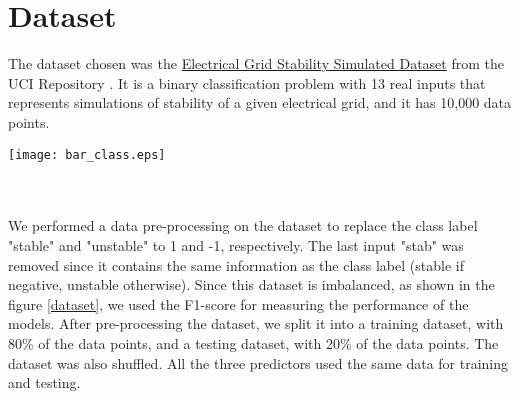 \documentclass{article}
\newcommand{\enterProblemHeader}[1]{
\nobreak\extramarks{#1}{#1}\nobreak
\nobreak\extramarks{#1}{#1}\nobreak
}
\newcommand{\exitProblemHeader}[1]{
\nobreak\extramarks{#1}{#1}\nobreak
\nobreak\extramarks{#1}{}\nobreak
}
\newcounter{homeworkProblemCounter} %
\newcommand{\homeworkProblemName}{}
\newenvironment{homeworkProblem}[1][Problem \arabic{homeworkProblemCounter}]{ %
\stepcounter{homeworkProblemCounter} %
\renewcommand{\homeworkProblemName}{#1} %
\section{\homeworkProblemName} %
\enterProblemHeader{} %
}{
\exitProblemHeader{} %
}
\begin{document}
\begin{homeworkProblem}[Dataset]
The dataset chosen was the \href{http://archive.ics.uci.edu/ml/datasets/Electrical+Grid+Stability+Simulated+Data+}{Electrical Grid Stability Simulated Dataset} from the UCI Repository \cite{UCI}. It is a binary classification problem with 13 real inputs that represents simulations of stability of a given electrical grid, and it has 10,000 data points.
\begin{multicols*}{2}
\begin{minipage}[t]{0.44\textwidth}
\centering
    \texttt{[image: bar\_class.eps]}
 \label{dataset}
\end{minipage}
\\
\\
We performed a data pre-processing on the dataset to replace the class label "stable" and "unstable" to 1 and -1, respectively. The last input "stab" was removed since it contains the same information as the class label (stable if negative, unstable otherwise). Since this dataset is imbalanced, as shown in the figure \ref{dataset}, we used the F1-score for measuring the performance of the models. After pre-processing the dataset, we split it into a training dataset, with 80\% of the data points, and a testing dataset, with 20\% of the data points. The dataset was also shuffled. All the three predictors used the same data for training and testing. 
\end{multicols*}
\end{homeworkProblem}
\clearpage
\end{document}
